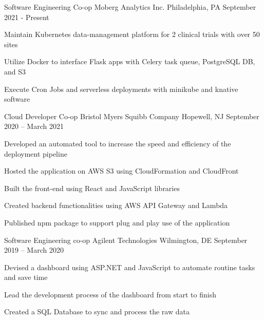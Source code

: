 

\begin{cventries}

  
	\cventry
	{Software Engineering Co-op}
	{Moberg Analytics Inc.}
	{Philadelphia, PA}
	{September 2021 - Present}
	{\begin{cvitems}
		\item {Maintain Kubernetes data-management platform for 2 clinical trials with over 50 sites}
		\item {Utilize Docker to interface Flask apps with Celery task queue, PostgreSQL DB, and S3}
		\item {Execute Cron Jobs and serverless deployments with minikube and knative software}
		\end{cvitems}}
	
	\vspace{-2mm}
	\cventry
	{Cloud Developer Co-op}
	{Bristol Myers Squibb Company}
	{Hopewell, NJ}
	{September 2020 – March 2021}
	{\begin{cvitems}
		\item {Developed an automated tool to increase the speed and efficiency of the deployment pipeline}
        \item {Hosted the application on AWS S3 using CloudFormation and CloudFront}
        \item {Built the front-end using React and JavaScript libraries}
        \item {Created backend functionalities using AWS API Gateway and Lambda}
        \item {Published npm package to support plug and play use of the application}
		\end{cvitems}}
	
	\vspace{-2mm}
	\cventry
	{Software Engineering co-op}
	{Agilent Technologies}
	{Wilmington, DE}
	{September 2019 – March 2020}
	{\begin{cvitems}
	    \item {Devised a dashboard using ASP.NET and JavaScript to automate routine tasks and save time}
        \item {Lead the development process of the dashboard from start to finish}
        \item {Created a SQL Database to sync and process the raw data}
		\end{cvitems}}
	

\end{cventries}
